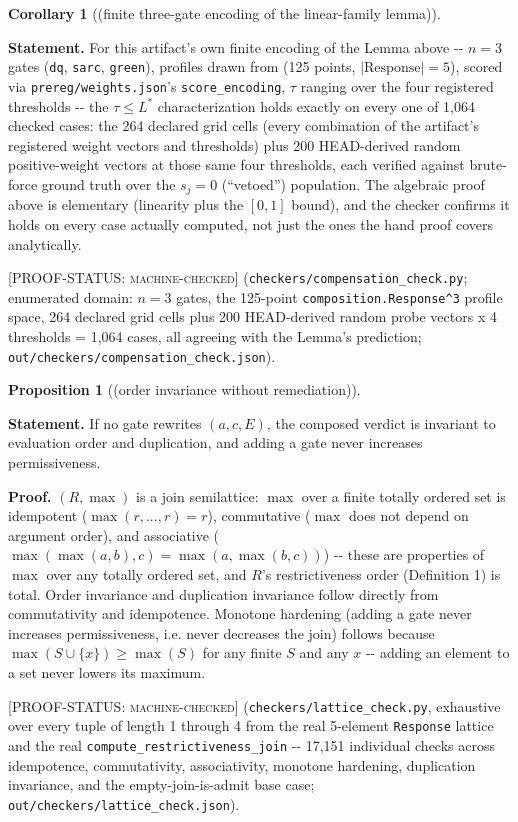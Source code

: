 \documentclass[11pt,a4paper]{article}
\theoremstyle{definition}
\newtheorem{proposition}{Proposition}
\newtheorem{corollary}{Corollary}
\newcommand{\proofstatus}[1]{[\textsc{PROOF-STATUS}: \textsc{#1}]}
\begin{document}
\setcounter{corollary}{1}
\begin{corollary}[(finite three-gate encoding of the linear-family lemma)]
\label{cor:2}

\noindent\textbf{Statement.} For this artifact's own finite encoding of the Lemma above -{}- $n = 3$ gates (\texttt{dq}, \texttt{sarc}, \texttt{green}), profiles drawn from  (125 points, $|\mathrm{Response}| = 5$), scored via \texttt{prereg/weights.json}'s \texttt{score\_encoding}, $\tau$ ranging over the four registered thresholds -{}- the $\tau \leq L^*$ characterization holds exactly on every one of 1,064 checked cases: the 264 declared grid cells (every combination of the artifact's registered weight vectors and thresholds) plus 200 HEAD-derived random positive-weight vectors at those same four thresholds, each verified against brute-force ground truth over the $s_j = 0$ (``vetoed'') population. The algebraic proof above is elementary (linearity plus the $[0,1]$ bound), and the checker confirms it holds on every case actually computed, not just the ones the hand proof covers analytically.

\proofstatus{machine-checked} (\texttt{checkers/compensation\_check.py}; enumerated domain: $n = 3$ gates, the 125-point \texttt{composition.Response\textasciicircum3} profile space, 264 declared grid cells plus 200 HEAD-derived random probe vectors x 4 thresholds = 1,064 cases, all agreeing with the Lemma's prediction; \texttt{out/checkers/compensation\_check.json}).
\end{corollary}

\begin{proposition}[(order invariance without remediation)]
\label{prop:2}

\noindent\textbf{Statement.} If no gate rewrites $(a, c, E)$, the composed verdict is invariant to evaluation order and duplication, and adding a gate never increases permissiveness.

\noindent\textbf{Proof.} $(R, \max)$ is a join semilattice: $\max$ over a finite totally ordered set is idempotent ($\max(r,...,r) = r$), commutative ($\max$ does not depend on argument order), and associative ($\max(\max(a,b),c) = \max(a,\max(b,c))$) -{}- these are properties of $\max$ over any totally ordered set, and $R$'s restrictiveness order (Definition 1) is total. Order invariance and duplication invariance follow directly from commutativity and idempotence. Monotone hardening (adding a gate never increases permissiveness, i.e. never decreases the join) follows because $\max(S \cup \{x\}) \geq \max(S)$ for any finite $S$ and any $x$ -{}- adding an element to a set never lowers its maximum.

\proofstatus{machine-checked} (\texttt{checkers/lattice\_check.py}, exhaustive over every tuple of length 1 through 4 from the real 5-element \texttt{Response} lattice and the real \texttt{compute\_restrictiveness\_join} -{}- 17,151 individual checks across idempotence, commutativity, associativity, monotone hardening, duplication invariance, and the empty-join-is-admit base case; \texttt{out/checkers/lattice\_check.json}).
\end{proposition}
\end{document}
